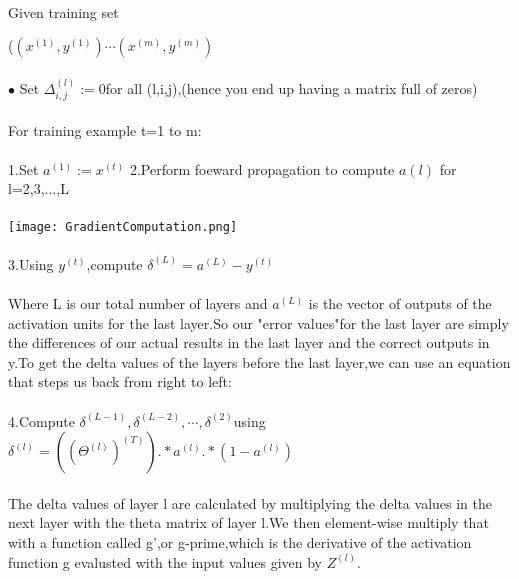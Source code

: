 \documentclass[UTF8]{ctexart}
\begin{document}
\paragraph{}
Given training set{($(x^{(1)},y^{(1)}) \cdots (x^{(m)},y^{(m)})$
\paragraph{}
$\bullet$ Set $\Delta_{i,j}^{(l)}:=0$for all (l,i,j),(hence you end up having a matrix full of zeros)
\paragraph{}
For training example t=1 to m:
\paragraph{}
1.Set $a^{(1)}:=x^{(t)}$
2.Perform foeward propagation to compute $a{(l)}$ for l=2,3,...,L
\paragraph{}
\texttt{[image: GradientComputation.png]}
\paragraph{}
3.Using $y^{(t)}$,compute $\delta^{(L)}=a^{(L)}-y^{(t)}$
\paragraph{}
Where L is our total number of layers and $a^{(L)}$ is the vector of outputs of the activation units for the last layer.So our "error values"for the last layer are simply the differences of our actual results in the last layer and the correct outputs in y.To get the delta values of the layers before the last layer,we can use an equation that steps us back from right to left:
\paragraph{}
4.Compute $\delta^{(L-1)},\delta^{(L-2)},\cdots,\delta^{(2)}$using $\delta^{(l)}=((\Theta^{(l)})^{(T)}).*a^{(l)}.*(1-a^{(l)})$
\paragraph{}
The delta values of layer l are calculated by multiplying the delta values in the next layer with the theta matrix of layer l.We then element-wise multiply that with a function called g',or g-prime,which is the derivative of the activation function g evalusted with the input values given by $Z^{(l)}$.
}
\end{document}
